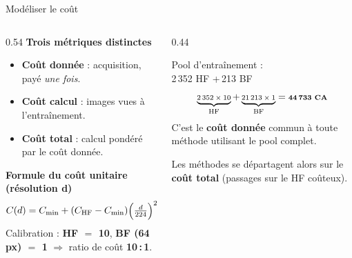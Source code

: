 \documentclass[aspectratio=169, 11pt]{beamer}
\begin{document}
\begin{frame}{Modéliser le coût}
  \begin{columns}[T]
    \begin{column}{0.54\textwidth}
      \textbf{Trois métriques distinctes}
      \begin{itemize}
        \item \textbf{Coût donnée} : acquisition, payé \emph{une fois}.
        \item \textbf{Coût calcul} : images vues à l'entraînement.
        \item \textbf{Coût total} : calcul pondéré par le coût donnée.
      \end{itemize}
      \vspace{0.3em}
      \textbf{Formule du coût unitaire (résolution d)}
      \[
        \footnotesize
        C(d) = C_{\min} + (C_{\mathrm{HF}}-C_{\min})\Big(\tfrac{d}{224}\Big)^{2}
      \]
      \footnotesize Calibration : \textbf{HF $=$ 10}, \textbf{BF (64\,px) $=$ 1}
      $\Rightarrow$ ratio de coût \textbf{10\,:\,1}.
    \end{column}
    \begin{column}{0.44\textwidth}
      \begin{card}
        Pool d'entraînement :\\
        2\,352 HF \;+\,213 BF
        \[
          \scriptsize
          \underbrace{2\,352\times 10}_{\text{HF}} + \underbrace{21\,213\times 1}_{\text{BF}}
          = \textbf{44\,733 CA}
        \]
        \scriptsize C'est le \textbf{coût donnée} commun à toute méthode utilisant le pool complet.
      \end{card}
      \vspace{0.3em}
      \begin{center}\scriptsize\color{muted}
        Les méthodes se départagent alors sur le \textbf{coût total} (passages sur le HF coûteux).
      \end{center}
    \end{column}
  \end{columns}
\end{frame}
\end{document}
